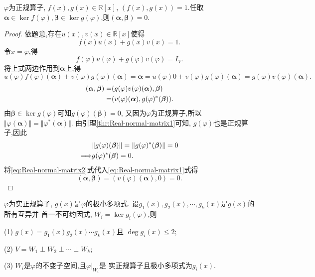\begin{theory}\label{thr:Real-normal-matrix2}
  $\varphi$为正规算子, $f(x), g(x)\in \mathbb{R}[x]$,
  $(f(x), g(x))=1$.任取$\bm{\alpha}\in\ker f(\varphi),
  \bm{\beta}\in \ker g(\varphi)$,则$(\bm{\alpha},\bm{\beta})=0$.
\end{theory}

\begin{proof}
  依题意,存在$u(x),v(x)\in \mathbb{R}[x]$使得
  \[
    f(x)u(x)+g(x)v(x)=1.
  \]
  令$x=\varphi$,得
  \[
   f(\varphi)u(\varphi)+g(\varphi)v(\varphi)=I_V.
 \]
 将上式两边作用到$\bm{\alpha}$上,得
 \[
   u(\varphi)f(\varphi)(\bm{\alpha})+v(\varphi)g(\varphi)(\bm{\alpha})=\bm{\alpha}
   = u(\varphi)0+v(\varphi)g(\varphi)(\bm{\alpha})=g(\varphi)v(\varphi)(\bm{\alpha}).
 \]
 \begin{align}
   (\bm{\alpha},\bm{\beta})= & (g(\varphi)v(\varphi)(\bm{\alpha}),\bm{\beta})\notag\\
    = & (v(\varphi)(\bm{\alpha}),g(\varphi)^*(\bm{\beta}))\label{eq:Real-normal-matrix1}.
 \end{align}
 由$\bm{\beta}\in\ker g(\varphi)$可知$g(\varphi)(\bm{\beta})=0$,
 又因为$\varphi$为正规算子,所以
 $\Vert\varphi(\bm{\alpha})\Vert=\Vert\varphi^*(\bm{\alpha})\Vert$.
 由引理\ref{thr:Real-normal-matrix1}可知,
 $g(\varphi)$也是正规算子,因此
 \begin{align}
   & \Vert g(\varphi)(\bm{\beta})\Vert=\Vert g(\varphi)^*(\bm{\beta})\Vert=0\notag\\
   \Longrightarrow & g(\varphi)^*(\bm{\beta})=0\label{eq:Real-normal-matrix2}.
 \end{align}
 将\eqref{eq:Real-normal-matrix2}式代入\eqref{eq:Real-normal-matrix1}式得
  \[
    (\bm{\alpha},\bm{\beta})=(v(\varphi)(\bm{\alpha}),0)=0.
  \]
\end{proof}

\begin{theorem}\label{thm:Real-normal-matrix1}
  $\varphi$为实正规算子, $g(x)$是$\varphi$的极小多项式.
  设$g_1(x),g_2(x),\cdots,g_k(x)$是$g(x)$的所有互异并
  首一不可约因式, $W_i=\ker g_i(\varphi)$,则

  (1) $g(x)=g_1(x)g_2(x)\cdots g_k(x)$且
  $\deg g_i(x)\leq 2$;

  (2) $V=W_1\perp W_2\perp \cdots \perp W_k$;

  (3) $W_i$是$\varphi$的不变子空间,且$\varphi|_{W_i}$是
  实正规算子且极小多项式为$g_i(x)$.
\end{theorem}

